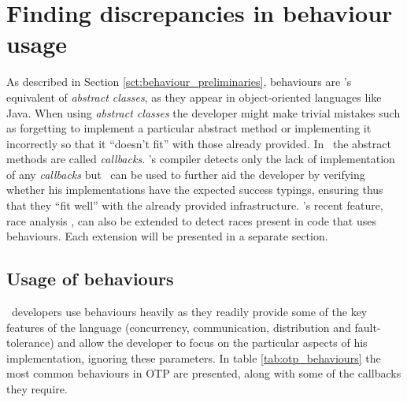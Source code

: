 \chapter{Finding discrepancies in behaviour usage}
\label{chp:behaviours}

As described in Section \ref{sct:behaviour_preliminaries}, behaviours
are \er's equivalent of \emph{abstract classes}, as they appear in
object-oriented languages like Java. When using \emph{abstract
  classes} the developer might make trivial mistakes such as
forgetting to implement a particular abstract method or implementing
it incorrectly so that it ``doesn't fit'' with those already
provided. In \er\ the abstract methods are called
\emph{callbacks}. \er's compiler detects only the lack of
implementation of any \emph{callbacks} but \dr\ can be used to further
aid the developer by verifying whether his implementations have the
expected success typings, ensuring thus that they ``fit well'' with
the already provided infrastructure. \dr's recent feature, race
analysis \cite{Races@PADL-10}, can also be extended to detect races
present in code that uses behaviours. Each extension will be presented
in a separate section.

\section{Usage of behaviours}

\er\ developers use behaviours heavily as they readily provide some of
the key features of the language (concurrency, communication,
distribution and fault-tolerance) and allow the developer to focus on
the particular aspects of his implementation, ignoring these
parameters. In table \ref{tab:otp_behaviours} the most common
behaviours in OTP are presented, along with some of the callbacks they
require.

